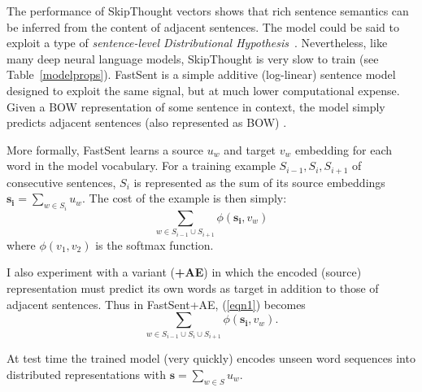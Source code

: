\vspace{5pt} The performance of SkipThought vectors shows that rich sentence semantics can be inferred from the content of adjacent sentences. The model could be said to exploit a type of \emph{sentence-level Distributional Hypothesis}~\citep{harris1954distributional,polajnar2015exploration}. Nevertheless, like many deep neural language models, SkipThought is very slow to train (see Table~\ref{modelprops}). FastSent is a simple additive (log-linear) sentence model designed to exploit the same signal, but at much lower computational expense. Given a BOW representation of some sentence in context, the model simply predicts adjacent sentences (also represented as BOW) .

More formally, FastSent learns a source \(u_w\) and target \(v_w\) embedding for each word in the model vocabulary. For a training example  \(S_{i-1},S_i,S_{i+1}\) of consecutive sentences, \(S_i\) is represented as the sum of its source embeddings \( \mathbf{s_i} = \sum_{w \in S_i} u_w \). The cost of the example is then simply:
\begin{equation} \label{eqn1}
 \sum_{w \in S_{i-1} \cup S_{i+1}} \phi(\mathbf{s_i},v_w) 
 \end{equation}
 where \( \phi(v_1,v_2) \) is the softmax function.  

I also experiment with a variant ({\bf+AE}) in which the encoded (source) representation must predict its own words as target in addition to those of adjacent sentences. Thus in FastSent+AE, (\ref{eqn1}) becomes  \begin{equation} 
\sum_{w \in S_{i-1} \cup S_{i} \cup S_{i+1}} \phi(\mathbf{s_i},v_w).
\end{equation}

\noindent At test time the trained model (very quickly) encodes unseen word sequences into distributed representations with \( \mathbf{s} = \sum_{w \in S} u_w \).

